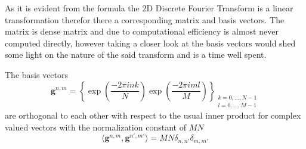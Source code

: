 As it is evident from the formula the $2$D Discrete Fourier Transform is a linear transformation therefor 
there a corresponding matrix and basis vectors. The matrix is dense matrix and due to computational efficiency 
is almost never computed directly, however taking a closer look at the basis vectors would shed some light on 
the nature of the said transform and is a time well spent.

\begin{Prop}\label{Prop:2ddftbasisvectors}
    The basis vectors
    \begin{equation}\label{eq:2ddftbasisvectors}
        \boldsymbol{g}^{n,m} = \left\{\exp\left({\frac{-2\pi ink}{N}}\right)\exp\left({\frac{-2\pi iml}{M}}\right)\right\}_{\substack{k=0,\ldots,N-1\\l=0,\ldots,M-1}}
    \end{equation}
    are orthogonal to each other with respect to the usual inner product for complex valued vectors 
    with the normalization constant of $MN$
    \begin{equation}
        \langle\boldsymbol{g}^{n,m},\boldsymbol{g}^{n',m'}\rangle= MN \delta_{n,n'}\delta_{m,m'}
    \end{equation}
\end{Prop}

